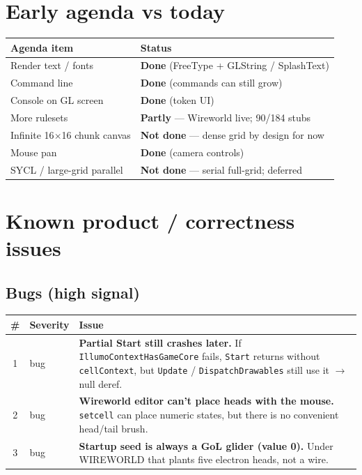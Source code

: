 \documentclass[10pt,a4paper]{article}
\begin{document}
\section{Early agenda vs today}
\begin{table}[h!]
\centering
\small
\begin{tabularx}{\textwidth}{l X}
\toprule
\textbf{Agenda item} & \textbf{Status} \\
\midrule
Render text / fonts & \textbf{Done} (FreeType + GLString / SplashText) \\
Command line & \textbf{Done} (commands can still grow) \\
Console on GL screen & \textbf{Done} (token UI) \\
More rulesets & \textbf{Partly} --- Wireworld live; 90/184 stubs \\
Infinite 16$\times$16 chunk canvas & \textbf{Not done} --- dense grid by design for now \\
Mouse pan & \textbf{Done} (camera controls) \\
SYCL / large-grid parallel & \textbf{Not done} --- serial full-grid; deferred \\
\bottomrule
\end{tabularx}
\end{table}

\section{Known product / correctness issues}

\subsection{Bugs (high signal)}
\begin{table}[h!]
\centering
\small
\begin{tabularx}{\textwidth}{c l X}
\toprule
\textbf{\#} & \textbf{Severity} & \textbf{Issue} \\
\midrule
1 & bug & \textbf{Partial Start still crashes later.} If \texttt{IllumoContextHasGameCore} fails, \texttt{Start} returns without \texttt{cellContext}, but \texttt{Update} / \texttt{DispatchDrawables} still use it $\rightarrow$ null deref. \\
2 & bug & \textbf{Wireworld editor can't place heads with the mouse.} \texttt{setcell} can place numeric states, but there is no convenient head/tail brush. \\
3 & bug & \textbf{Startup seed is always a GoL glider (value 0).} Under WIREWORLD that plants five electron heads, not a wire. \\
\bottomrule
\end{tabularx}
\end{table}
\end{document}
